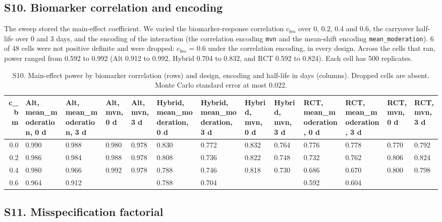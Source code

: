 \documentclass[
  11pt,
]{article}
\begin{document}
\subsection{S10. Biomarker correlation and encoding}\label{s10.-biomarker-correlation-and-encoding}

The sweep stored the main-effect coefficient. We varied the biomarker-response correlation \(c_{bm}\) over 0, 0.2, 0.4 and 0.6, the carryover half-life over 0 and 3 days, and the encoding of the interaction (the correlation encoding \texttt{mvn} and the mean-shift encoding \texttt{mean\_moderation}). 6 of 48 cells were not positive definite and were dropped: \(c_{bm}\) = 0.6 under the correlation encoding, in every design. Across the cells that ran, power ranged from 0.592 to 0.992 (Alt 0.912 to 0.992, Hybrid 0.704 to 0.832, and RCT 0.592 to 0.824). Each cell has 500 replicates.

\begin{table}
\centering
\caption{\label{tab:s10-tab}S10. Main-effect power by biomarker correlation (rows) and design, encoding and half-life in days (columns). Dropped cells are absent. Monte Carlo standard error at most 0.022.}
\centering
\fontsize{6}{8}\selectfont
\begin{tabular}[t]{rllllllllllll}
\toprule
c\_bm & Alt, mean\_moderation, 0 d & Alt, mean\_moderation, 3 d & Alt, mvn, 0 d & Alt, mvn, 3 d & Hybrid, mean\_moderation, 0 d & Hybrid, mean\_moderation, 3 d & Hybrid, mvn, 0 d & Hybrid, mvn, 3 d & RCT, mean\_moderation, 0 d & RCT, mean\_moderation, 3 d & RCT, mvn, 0 d & RCT, mvn, 3 d\\
\midrule
0.0 & 0.990 & 0.988 & 0.980 & 0.978 & 0.830 & 0.772 & 0.832 & 0.764 & 0.776 & 0.778 & 0.770 & 0.792\\
0.2 & 0.986 & 0.984 & 0.988 & 0.978 & 0.808 & 0.736 & 0.822 & 0.748 & 0.732 & 0.762 & 0.806 & 0.824\\
0.4 & 0.980 & 0.966 & 0.992 & 0.978 & 0.788 & 0.746 & 0.818 & 0.730 & 0.686 & 0.670 & 0.800 & 0.798\\
0.6 & 0.964 & 0.912 &  &  & 0.788 & 0.704 &  &  & 0.592 & 0.604 &  & \\
\bottomrule
\end{tabular}
\end{table}

\subsection{S11. Misspecification factorial}\label{s11.-misspecification-factorial}
\end{document}
